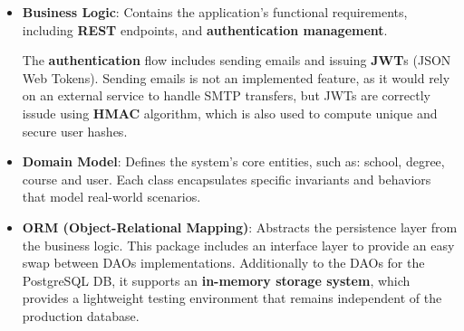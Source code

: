 \begin{itemize}
	\item \textbf{Business Logic}: Contains the application’s functional requirements, including \textbf{REST} endpoints, and \textbf{authentication management}.

		The \textbf{authentication} flow includes sending emails and issuing \textbf{JWT}s (JSON Web Tokens). Sending emails is not an implemented feature, as it would rely on an external service to handle SMTP transfers, but JWTs are correctly issude using \textbf{HMAC} algorithm, which is also used to compute unique and secure user hashes.

	\item \textbf{Domain Model}: Defines the system's core entities, such as: school, degree, course and user. Each class encapsulates specific invariants and behaviors that model real-world scenarios. 
	
	\item \textbf{ORM (Object-Relational Mapping)}: Abstracts the persistence layer from the business logic. This package includes an interface layer to provide an easy swap between DAOs implementations. 
	Additionally to the DAOs for the PostgreSQL DB, it supports an \textbf{in-memory storage system}, which provides a lightweight testing environment that remains independent of the production database.
\end{itemize}

